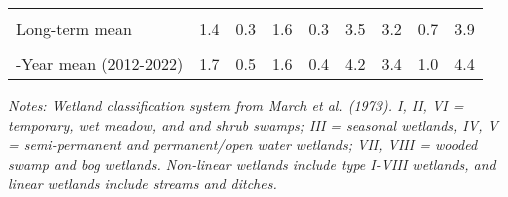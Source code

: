 \documentclass[
  12pt,
]{article}
\begin{document}
\begin{table}[!h]
{\begin{threeparttable}
\begin{tabular}[t]{>{\centering\arraybackslash}m{8em}cccccccc}
\cellcolor{gray!6}{\% Change from previous year} & \cellcolor{gray!6}{142.0\%} & \cellcolor{gray!6}{34.3\%} & \cellcolor{gray!6}{-37.3\%} & \cellcolor{gray!6}{442.9\%} & \cellcolor{gray!6}{40.1\%} & \cellcolor{gray!6}{-28.9\%} & \cellcolor{gray!6}{84.0\%} & \cellcolor{gray!6}{-16.2\%}\\
Long-term mean & 1.4 & 0.3 & 1.6 & 0.3 & 3.5 & 3.2 & 0.7 & 3.9\\
\cellcolor{gray!6}{\% Change from long-term mean} & \cellcolor{gray!6}{48.6\%} & \cellcolor{gray!6}{72.3\%} & \cellcolor{gray!6}{-21.4\%} & \cellcolor{gray!6}{243.6\%} & \cellcolor{gray!6}{34.7\%} & \cellcolor{gray!6}{6.7\%} & \cellcolor{gray!6}{67.4\%} & \cellcolor{gray!6}{17.2\%}\\
10-Year mean (2012-2022) & 1.7 & 0.5 & 1.6 & 0.4 & 4.2 & 3.4 & 1.0 & 4.4\\
\bottomrule
\end{tabular}
\begin{tablenotes}
\small
\item \textit{Notes: Wetland classification system from March et al. (1973). 
      I, II, VI = temporary, wet meadow, and and shrub swamps; III = seasonal wetlands, IV, V = semi-permanent 
      and permanent/open water wetlands; VII, VIII = wooded swamp and bog wetlands. Non-linear wetlands include
      type I-VIII wetlands, and linear wetlands include streams and ditches.} 
\item 
\end{tablenotes}
\end{threeparttable}}
\end{table}

\newpage
\end{document}
